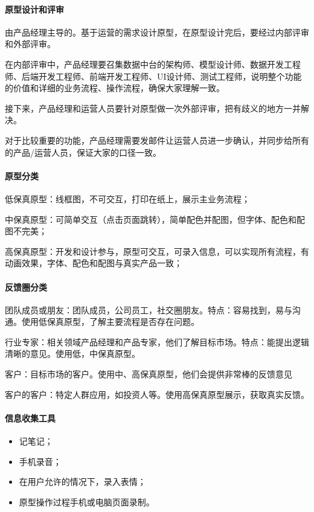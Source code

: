\documentclass[letterpaper,11pt,english]{sphinxmanual}
\begin{document}
\paragraph{原型设计和评审}
\label{\detokenize{chapter_skill/prototype_design:id2}}
由产品经理主导的。基于运营的需求设计原型，在原型设计完后，要经过内部评审和外部评审。

在内部评审中，产品经理要召集数据中台的架构师、模型设计师、数据开发工程师、后端开发工程师、前端开发工程师、UI设计师、测试工程师，说明整个功能的价值和详细的业务流程、操作流程，确保大家理解一致。

接下来，产品经理和运营人员要针对原型做一次外部评审，把有歧义的地方一并解决。

对于比较重要的功能，产品经理需要发邮件让运营人员进一步确认，并同步给所有的产品/运营人员，保证大家的口径一致。


\paragraph{原型分类}
\label{\detokenize{chapter_skill/prototype_design:id3}}
低保真原型：线框图，不可交互，打印在纸上，展示主业务流程；

中保真原型：可简单交互（点击页面跳转），简单配色并配图，但字体、配色和配图不完美；

高保真原型：开发和设计参与，原型可交互，可录入信息，可以实现所有流程，有动画效果，字体、配色和配图与真实产品一致；


\paragraph{反馈圈分类}
\label{\detokenize{chapter_skill/prototype_design:id4}}
团队成员或朋友：团队成员，公司员工，社交圈朋友。特点：容易找到，易与沟通。使用低保真原型，了解主要流程是否存在问题。

行业专家：相关领域产品经理和产品专家，他们了解目标市场。特点：能提出逻辑清晰的意见。使用低，中保真原型。

客户：目标市场的客户。使用中、高保真原型，他们会提供非常棒的反馈意见

客户的客户：特定人群应用，如投资人等。使用高保真原型展示，获取真实反馈。


\paragraph{信息收集工具}
\label{\detokenize{chapter_skill/prototype_design:id5}}\begin{itemize}
\item {} 
记笔记；

\item {} 
手机录音；

\item {} 
在用户允许的情况下，录入表情；

\item {} 
原型操作过程手机或电脑页面录制。

\end{itemize}
\end{document}
